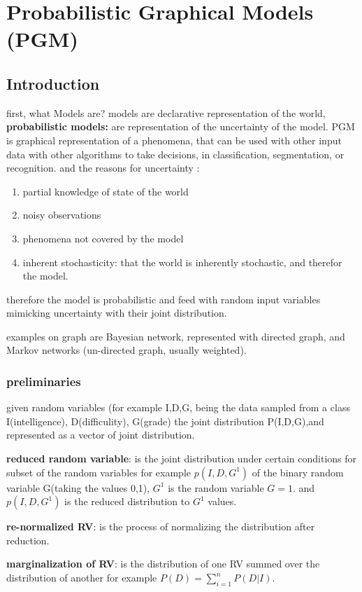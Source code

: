 \documentclass[4apaper,12pt]{book}
\begin{document}
  \chapter{Probabilistic Graphical Models (PGM)}
  \section{Introduction}
  \begin{description}
  \item first, what Models are? models are declarative representation of the world, \textbf{probabilistic models:} are representation of the uncertainty of the model. PGM is graphical representation of a phenomena, that can be used with other input data with other algorithms to take decisions, in classification, segmentation, or  recognition. and the reasons for uncertainty : \begin{enumerate}
  \item partial knowledge of state of the world
  \item noisy observations
  \item phenomena not covered by the model
    \item inherent stochasticity: that the world is inherently stochastic, and therefor the model.
  \end{enumerate}
  \item therefore the model is probabilistic and feed with random input variables mimicking uncertainty with their joint distribution.
  \item examples on graph are Bayesian network, represented with directed graph, and Markov networks (un-directed graph, usually weighted).
    \subsection{preliminaries}
    \begin{description}
    \item given random variables (for example I,D,G, being the data sampled from a class I(intelligence), D(difficulity), G(grade) the joint distribution P(I,D,G),and represented as a vector of joint distribution.
    \item \textbf{reduced random variable}: is the joint distribution under certain conditions for subset of the random variables for example $p(I,D,G^1)$ of the binary random variable G(taking the values 0,1), $G^1$ is the random variable $G=1$. and $p(I,D,G^1)$ is the reduced distribution to $G^1$ values.
    \item \textbf{re-normalized RV}: is the process of normalizing the distribution after reduction.
    \item \textbf{marginalization of RV}: is the distribution of one RV summed over the distribution of another for example $P(D)=\sum_{i=1}^nP(D|I)$.

\end{description}
\end{description}
\end{document}
